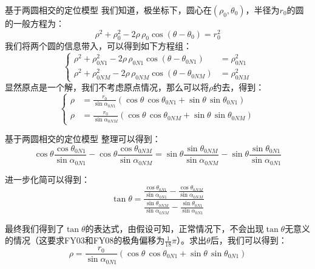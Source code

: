 \documentclass[aspectratio=169]{beamer}
\begin{document}
\begin{frame}{基于两圆相交的定位模型}
    我们知道，极坐标下，圆心在$(\rho_0,\theta_0)$，半径为$r_0$的圆的一般方程为：
    \begin{equation}
        \rho^2 + \rho_0^2 - 2\rho\,\rho_0\cos\left(\theta - \theta_0\right) = r_0^2
    \end{equation}
    我们将两个圆的信息带入，可以得到如下方程组：
    \begin{equation}
        \left\{
        \begin{aligned}
            \rho^2 + \rho_{0N1}^2 - 2\rho\,\rho_{0N1}\cos\left(\theta - \theta_{0N1}\right) &= \rho_{0N1}^2\\
            \rho^2 + \rho_{0NM}^2 - 2\rho\,\rho_{0NM}\cos\left(\theta - \theta_{0NM}\right) &= \rho_{0NM}^2
        \end{aligned}
        \right.
    \end{equation}
    显然原点是一个解，我们不考虑原点情况，那么可以将$\rho$约去，得到：
    \begin{equation}
        \left\{
        \begin{aligned}
            \rho &= \frac{r_0}{\sin \alpha_{0N1}}\left(\cos\theta\,\cos\theta_{0N1} + \sin\theta\,\sin\theta_{0N1}\right)\\
            \rho &= \frac{r_0}{\sin \alpha_{0NM}}\left(\cos\theta\,\cos\theta_{0NM} + \sin\theta\,\sin\theta_{0NM}\right)
        \end{aligned}
        \right.
    \end{equation}
\end{frame}

\begin{frame}{基于两圆相交的定位模型}
    整理可以得到：
    \begin{equation}
        \cos\theta\frac{\cos\theta_{0N1}}{\sin\alpha_{0N1}} - \cos\theta\frac{\cos\theta_{0NM}}{\sin\alpha_{0NM}} =
        \sin\theta\frac{\sin\theta_{0NM}}{\sin\alpha_{0NM}} - \sin\theta\frac{\sin\theta_{0N1}}{\sin\alpha_{0N1}}
    \end{equation}

    进一步化简可以得到：
    \begin{equation}
        \tan\theta = \frac
        {\frac{\cos\theta_{0N1}}{\sin\alpha_{0N1}} - \frac{\cos\theta_{0NM}}{\sin\alpha_{0NM}}}
        {\frac{\sin\theta_{0NM}}{\sin\alpha_{0NM}} - \frac{\sin\theta_{0N1}}{\sin\alpha_{0N1}}}
    \end{equation}

    最终我们得到了$\tan\theta$的表达式，由假设可知，正常情况下，不会出现$\tan\theta$无意义的情况（这要求FY03和FY08的极角偏移为$\frac{1}{18}\pi$）。求出$\theta$后，我们可以得到：
    \begin{equation}
        \rho = \frac{r_0}{\sin \alpha_{0N1}}\left(\cos\theta\,\cos\theta_{0N1} + \sin\theta\,\sin\theta_{0N1}\right)
        \label{eq:极径计算}
    \end{equation}
\end{frame}
\end{document}

